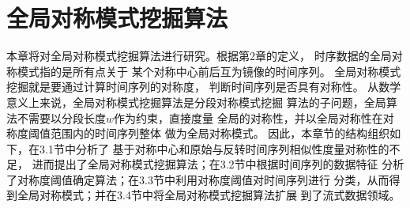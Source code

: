 
\chapter{全局对称模式挖掘算法}

本章将对全局对称模式挖掘算法进行研究。根据第2章的定义，
时序数据的全局对称模式指的是所有点关于
某个对称中心前后互为镜像的时间序列。
全局对称模式挖掘就是要通过计算时间序列的对称度，
判断时间序列是否具有对称性。
从数学意义上来说，全局对称模式挖掘算法是分段对称模式挖掘
算法的子问题，全局算法不需要以分段长度$w$作为约束，直接度量
全局的对称性，并以全局对称性在对称度阈值范围内的时间序列整体
做为全局对称模式。
因此，本章节的结构组织如下，在3.1节中分析了
基于对称中心和原始与反转时间序列相似性度量对称性的不足，
进而提出了全局对称模式挖掘算法；在3.2节中根据时间序列的数据特征
分析了对称度阈值确定算法；在3.3节中利用对称度阈值对时间序列进行
分类，从而得到全局对称模式；并在3.4节中将全局对称模式挖掘算法扩展
到了流式数据领域。

